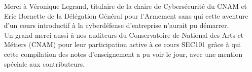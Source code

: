 

\newpage

\thispagestyle{empty}

\begin{center}


\large{Merci à Véronique Legrand, titulaire de la chaire de Cybersécurité du CNAM et Eric Bornette de la Délégation Général pour l'Armement sans qui cette aventure d'un cours introductif à la cyberdéfense d'entreprise n'aurait pu démarrer. 
\\ 
Un grand merci aussi à nos auditeurs du Conservatoire de National des Arts et Métiers (CNAM) pour leur participation active à ce cours SEC101 grâce à qui cette compilation des notes d'enseignement a pu voir le jour, avec une mention spéciale aux contributeurs. 
}



\end{center}




\clearpage 




